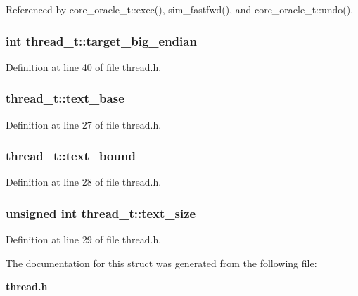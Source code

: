 Referenced by core\_\-oracle\_\-t::exec(), sim\_\-fastfwd(), and core\_\-oracle\_\-t::undo().
\subsubsection[{target\_\-big\_\-endian}]{\setlength{\rightskip}{0pt plus 5cm}int {\bf thread\_\-t::target\_\-big\_\-endian}}\label{structthread__t_4c798d0344a67cbb7a457c177fa6c8bf}




Definition at line 40 of file thread.h.
\subsubsection[{text\_\-base}]{ {\bf thread\_\-t::text\_\-base}}\label{structthread__t_36571a5c9c6d6454f4e5627037f886ed}




Definition at line 27 of file thread.h.
\subsubsection[{text\_\-bound}]{ {\bf thread\_\-t::text\_\-bound}}\label{structthread__t_7fc99de8048e941778c53de3f733aed9}




Definition at line 28 of file thread.h.
\subsubsection[{text\_\-size}]{\setlength{\rightskip}{0pt plus 5cm}unsigned int {\bf thread\_\-t::text\_\-size}}\label{structthread__t_706e6e5c74792b2c5a20ee69b504c7db}




Definition at line 29 of file thread.h.

The documentation for this struct was generated from the following file:\begin{CompactItemize}
\item 
{\bf thread.h}\end{CompactItemize}
